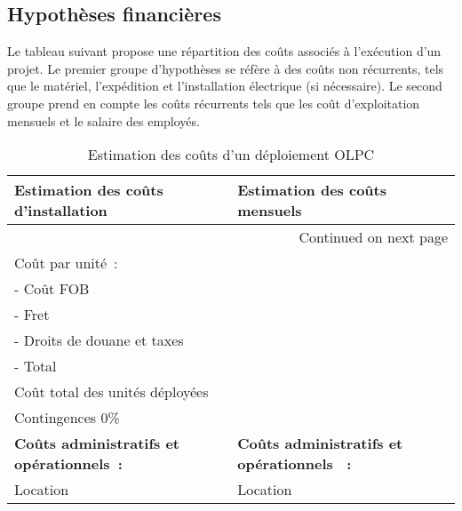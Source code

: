 \documentclass[11pt]{article}
\begin{document}
\subsection{Hypothèses financières}
\label{sec-6-3}



Le tableau suivant propose une répartition des coûts associés à l'exécution
d'un projet. Le premier groupe d'hypothèses se réfère à des coûts non
récurrents, tels que le matériel, l'expédition et l'installation électrique
(si nécessaire). Le second groupe prend en compte les coûts récurrents tels
que les coût d'exploitation mensuels et le salaire des employés.

\begin{longtable}{|l|l|}
\caption{Estimation des coûts d'un déploiement OLPC} \\
\hline
 Estimation des coûts d’installation               &  Estimation des coûts mensuels                     \\
\hline
\endhead
\hline\multicolumn{2}{r}{Continued on next page}\
\endfoot
\endlastfoot
\hline
 \textbf{Coûts généraux :}                         &                                                     \\
 Coût par unité :                                  &                                                     \\
 - Coût FOB                                        &                                                     \\
 - Fret                                            &                                                     \\
 - Droits de douane et taxes                       &                                                     \\
 - Total                                           &                                                     \\
 Coût total des unités déployées                   &                                                     \\
 Contingences 0\%                                  &                                                     \\
\hline
 \textbf{Coûts administratifs et opérationnels :}  &  \textbf{Coûts administratifs et opérationnels  :}  \\
 Location                                          &  Location                                           \\

\end{longtable}
\end{document}
